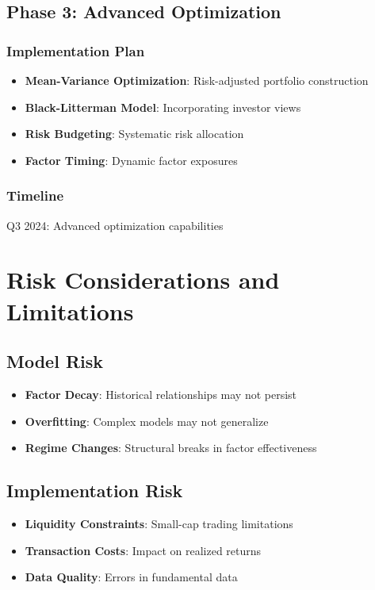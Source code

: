 \documentclass[12pt,a4paper]{article}
\begin{document}
\subsection{Phase 3: Advanced Optimization}

\subsubsection{Implementation Plan}
\begin{itemize}
    \item \textbf{Mean-Variance Optimization}: Risk-adjusted portfolio construction
    \item \textbf{Black-Litterman Model}: Incorporating investor views
    \item \textbf{Risk Budgeting}: Systematic risk allocation
    \item \textbf{Factor Timing}: Dynamic factor exposures
\end{itemize}

\subsubsection{Timeline}
Q3 2024: Advanced optimization capabilities

\section{Risk Considerations and Limitations}

\subsection{Model Risk}
\begin{itemize}
    \item \textbf{Factor Decay}: Historical relationships may not persist
    \item \textbf{Overfitting}: Complex models may not generalize
    \item \textbf{Regime Changes}: Structural breaks in factor effectiveness
\end{itemize}

\subsection{Implementation Risk}
\begin{itemize}
    \item \textbf{Liquidity Constraints}: Small-cap trading limitations
    \item \textbf{Transaction Costs}: Impact on realized returns
    \item \textbf{Data Quality}: Errors in fundamental data
\end{itemize}
\end{document}
